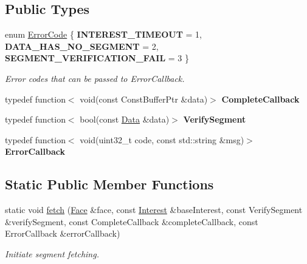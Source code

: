 \subsection*{Public Types}
\begin{DoxyCompactItemize}
\item 
enum \hyperlink{classndn_1_1util_1_1SegmentFetcher_ab0c2acc6a38f821994e7edff486a271d}{Error\+Code} \{ {\bfseries I\+N\+T\+E\+R\+E\+S\+T\+\_\+\+T\+I\+M\+E\+O\+UT} = 1, 
{\bfseries D\+A\+T\+A\+\_\+\+H\+A\+S\+\_\+\+N\+O\+\_\+\+S\+E\+G\+M\+E\+NT} = 2, 
{\bfseries S\+E\+G\+M\+E\+N\+T\+\_\+\+V\+E\+R\+I\+F\+I\+C\+A\+T\+I\+O\+N\+\_\+\+F\+A\+IL} = 3
 \}\hypertarget{classndn_1_1util_1_1SegmentFetcher_ab0c2acc6a38f821994e7edff486a271d}{}\label{classndn_1_1util_1_1SegmentFetcher_ab0c2acc6a38f821994e7edff486a271d}
\begin{DoxyCompactList}\small\item\em Error codes that can be passed to Error\+Callback. \end{DoxyCompactList}
\item 
typedef function$<$ void(const Const\+Buffer\+Ptr \&data)$>$ {\bfseries Complete\+Callback}\hypertarget{classndn_1_1util_1_1SegmentFetcher_ae8957a72e4a0a08db73493cbfad8ce16}{}\label{classndn_1_1util_1_1SegmentFetcher_ae8957a72e4a0a08db73493cbfad8ce16}

\item 
typedef function$<$ bool(const \hyperlink{classndn_1_1Data}{Data} \&data)$>$ {\bfseries Verify\+Segment}\hypertarget{classndn_1_1util_1_1SegmentFetcher_aae72e118b736e67b4bb63495d6b63b7c}{}\label{classndn_1_1util_1_1SegmentFetcher_aae72e118b736e67b4bb63495d6b63b7c}

\item 
typedef function$<$ void(uint32\+\_\+t code, const std\+::string \&msg)$>$ {\bfseries Error\+Callback}\hypertarget{classndn_1_1util_1_1SegmentFetcher_a73ca53735fde44120c03a45686ca19a5}{}\label{classndn_1_1util_1_1SegmentFetcher_a73ca53735fde44120c03a45686ca19a5}

\end{DoxyCompactItemize}
\subsection*{Static Public Member Functions}
\begin{DoxyCompactItemize}
\item 
static void \hyperlink{classndn_1_1util_1_1SegmentFetcher_a9f7c6f519893f5fe8bd822ed2adfc516}{fetch} (\hyperlink{classndn_1_1Face}{Face} \&face, const \hyperlink{classndn_1_1Interest}{Interest} \&base\+Interest, const Verify\+Segment \&verify\+Segment, const Complete\+Callback \&complete\+Callback, const Error\+Callback \&error\+Callback)
\begin{DoxyCompactList}\small\item\em Initiate segment fetching. \end{DoxyCompactList}\end{DoxyCompactItemize}


